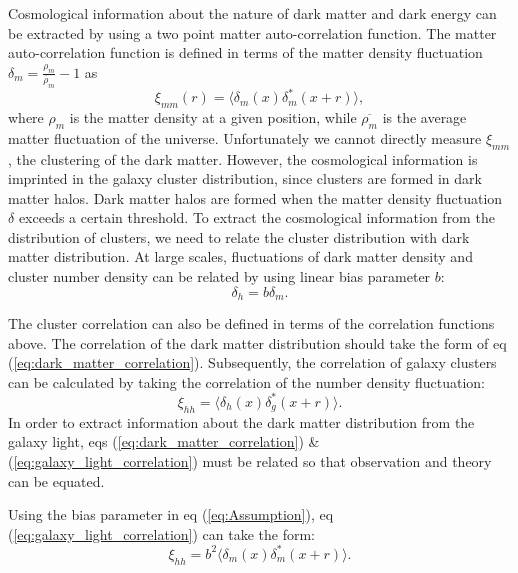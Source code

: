 \documentclass[iop]{emulateapj}
\begin{document}
Cosmological information about the nature of dark matter and dark energy can be extracted by using a two point matter auto-correlation function. The matter auto-correlation function is defined in terms of the matter density fluctuation $\delta_m = \frac{\rho_m} {\overline{\rho}_m} - 1$ as
	\begin{equation}
		\label{eq:dark_matter_correlation}
		\xi_{mm}(r) = \langle  \delta_m (x) \delta_m^* (x+r) \rangle,
	\end{equation}
where $\rho_m$ is the matter density at a given position, while $\overline{\rho_m}$ is the average matter fluctuation of the universe.
Unfortunately we cannot directly measure $\xi_{mm}$, the clustering of the dark matter. However, the cosmological information is imprinted in the galaxy cluster distribution, since clusters are formed in dark matter halos. Dark matter halos are formed when the matter density fluctuation $\delta$ exceeds a certain threshold. To extract the cosmological information from the distribution of clusters, we need to relate the cluster distribution with dark matter distribution. At large scales, fluctuations of dark matter density and cluster number density can be related by using linear bias parameter $b$:
	\begin{equation}
		\label{eq:Assumption}
		\delta_h = b \delta_m.
	\end{equation}

The cluster correlation can also be defined in terms of the correlation functions above. The correlation of the dark matter distribution should take the form of eq (\ref{eq:dark_matter_correlation}). Subsequently, the correlation of galaxy clusters can be calculated by taking the correlation of the number density fluctuation:
	\begin{equation}
		\label{eq:galaxy_light_correlation}
		\xi_{hh} = \langle \delta_h (x) \delta_{g}^*(x+r) \rangle.
	\end{equation}
In order to extract information about the dark matter distribution from the galaxy light, eqs (\ref{eq:dark_matter_correlation}) \& (\ref{eq:galaxy_light_correlation}) must be related so that observation and theory can be equated.

Using the bias parameter in eq (\ref{eq:Assumption}), eq (\ref{eq:galaxy_light_correlation}) can take the form:
	\begin{equation}
		\label{eq:fCorrelation}
		\xi_{hh} = b^2 \langle \delta_m (x) \delta_{m}^*(x+r) \rangle.
	\end{equation}
	
\end{document}
